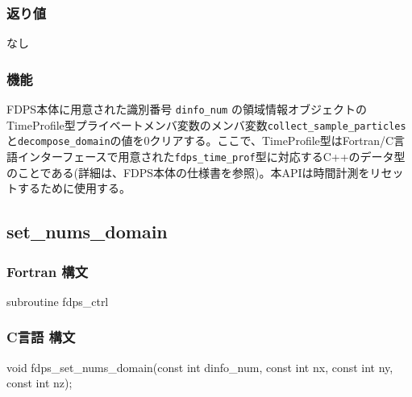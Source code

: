 \subsubsection*{返り値}
なし

\subsubsection*{機能}
FDPS本体に用意された識別番号 \texttt{dinfo\_num} の領域情報オブジェクトのTimeProfile型プライベートメンバ変数のメンバ変数\texttt{collect\_sample\_particles}と\texttt{decompose\_domain}の値を0クリアする。ここで、TimeProfile型はFortran/C言語インターフェースで用意された\texttt{fdps\_time\_prof}型に対応するC++のデータ型のことである(詳細は、FDPS本体の仕様書を参照)。本APIは時間計測をリセットするために使用する。

\clearpage

\subsection{set\_nums\_domain}
\subsubsection*{Fortran 構文}
\begin{screen}
\begin{spverbatim}
subroutine fdps_ctrl%
\end{spverbatim}
\end{screen}

\subsubsection*{C言語 構文}
\begin{screen}
\begin{spverbatim}
void fdps_set_nums_domain(const int dinfo_num,
                          const int nx,
                          const int ny,
                          const int nz);
\end{spverbatim}
\end{screen}

